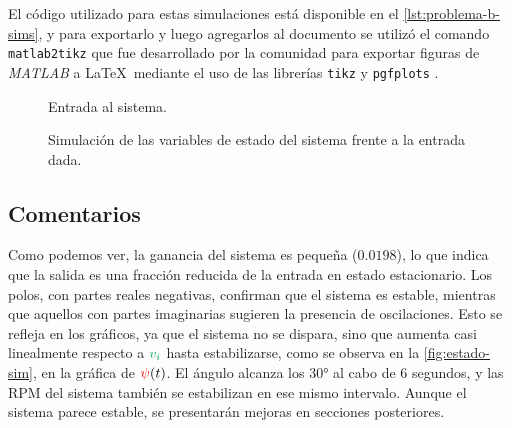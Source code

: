 El código utilizado para estas simulaciones está disponible en el \autoref{lst:problema-b-sims},
y para exportarlo y luego agregarlos al documento se utilizó el comando \texttt{matlab2tikz}
\cite{m2tikz} que fue desarrollado por la comunidad para exportar figuras de \textit{MATLAB} a
\LaTeX\ mediante el uso de las librerías \texttt{tikz} \cite{pgf} y \texttt{pgfplots}
\cite{pgfplots}.

\begin{figure}[h]
  \centering
  
  \caption{Entrada al sistema.}\label{fig:entrada-sim}
\end{figure}

\begin{figure}[h]
  \centering
  
  \caption{Simulación de las variables de estado del sistema frente a la entrada dada.}\label{fig:estado-sim}
\end{figure}


\subsection{Comentarios}
 
Como podemos ver, la ganancia del sistema es pequeña ($0.0198$), lo que indica
que la salida es una fracción reducida de la entrada en estado estacionario. Los
polos, con partes reales negativas, confirman que el sistema es estable, mientras
que aquellos con partes imaginarias sugieren la presencia de oscilaciones. Esto
se refleja en los gráficos, ya que el sistema no se dispara, sino que aumenta casi
linealmente respecto a $\verd{v_i}$ hasta estabilizarse, como se observa en la
\autoref{fig:estado-sim}, en la gráfica de $\mathbin{\color{red}\psi}(t)$. El ángulo alcanza los
$\ang{30}$ al cabo de $6$ segundos, y las RPM del sistema también se estabilizan
en ese mismo intervalo. Aunque el sistema parece estable, se presentarán mejoras
en secciones posteriores.
